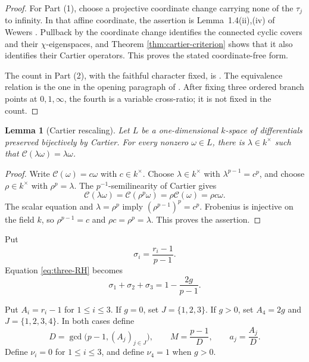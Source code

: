 \documentclass[11pt]{amsart}
\theoremstyle{plain}
\newtheorem{lemma}[theorem]{Lemma}
\theoremstyle{definition}
\numberwithin{equation}{section}
\begin{document}
\begin{proof}
For Part (1), choose a projective coordinate change carrying none of the
$\tau_j$ to infinity.  In that affine coordinate, the assertion is
Lemma~1.4(ii),(iv) of Wewers \cite{WewersMeta}.  Pullback by the coordinate change
identifies the connected cyclic covers and their $\chi$-eigenspaces, and
Theorem \ref{thm:cartier-criterion} shows that it also identifies their
Cartier operators.  This proves the stated coordinate-free form.

The count in Part (2), with the faithful character fixed, is
\cite[Proposition~3.8]{WewersMeta}.  The equivalence relation is the one in
the opening paragraph of \cite[Section~3.5]{WewersMeta}.  After fixing
three ordered branch points at $0,1,\infty$,
the fourth is a variable cross-ratio; it is not fixed in the count.
\end{proof}

\begin{lemma}[Cartier rescaling]\label{lem:cartier-rescaling}
Let $L$ be a one-dimensional $k$-space of differentials preserved
bijectively by Cartier.  For every nonzero $\omega\in L$, there is
$\lambda\in k^\times$ such that
$\mathcal C(\lambda\omega)=\lambda\omega$.
\end{lemma}

\begin{proof}
Write $\mathcal C(\omega)=c\omega$ with $c\in k^\times$.  Choose
$\lambda\in k^\times$ with $\lambda^{p-1}=c^p$, and choose
$\rho\in k^\times$ with $\rho^p=\lambda$.  The $p^{-1}$-semilinearity of
Cartier gives
\[
 \mathcal C(\lambda\omega)
 =\mathcal C(\rho^p\omega)=\rho\mathcal C(\omega)=\rho c\omega.
\]
The scalar equation and $\lambda=\rho^p$ imply
$(\rho^{p-1})^p=c^p$.  Frobenius is injective on the field $k$, so
$\rho^{p-1}=c$ and $\rho c=\rho^p=\lambda$.  This proves the assertion.
\end{proof}

Put
\[
 \sigma_i=\frac{r_i-1}{p-1}.
\]
Equation \eqref{eq:three-RH} becomes
\[
 \sigma_1+\sigma_2+\sigma_3=1-\frac{2g}{p-1}.
 \label{eq:signature-sum}
\]

Put $A_i=r_i-1$ for $1\leq i\leq3$.  If $g=0$, set
$J=\{1,2,3\}$.  If $g>0$, set $A_4=2g$ and
$J=\{1,2,3,4\}$.  In both cases define
\begin{equation}\label{eq:central-arithmetic}
 D=\gcd\bigl(p-1,(A_j)_{j\in J}\bigr),\qquad
 M=\frac{p-1}{D},\qquad a_j=\frac{A_j}{D}.
\end{equation}
Define $\nu_i=0$ for $1\leq i\leq3$, and define $\nu_4=1$ when $g>0$.
\end{document}
